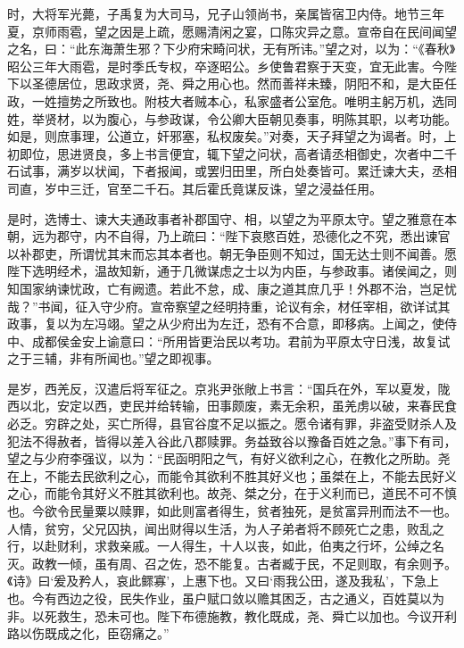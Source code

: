 \documentclass[12pt,UTF8]{ctexbook}
\begin{document}
时，大将军光薨，子禹复为大司马，兄子山领尚书，亲属皆宿卫内侍。地节三年夏，京师雨雹，望之因是上疏，愿赐清闲之宴，口陈灾异之意。宣帝自在民间闻望之名，曰：“此东海萧生邪？下少府宋畸问状，无有所讳。”望之对，以为：“《春秋》昭公三年大雨雹，是时季氏专权，卒逐昭公。乡使鲁君察于天变，宜无此害。今陛下以圣德居位，思政求贤，尧、舜之用心也。然而善祥未臻，阴阳不和，是大臣任政，一姓擅势之所致也。附枝大者贼本心，私家盛者公室危。唯明主躬万机，选同姓，举贤材，以为腹心，与参政谋，令公卿大臣朝见奏事，明陈其职，以考功能。如是，则庶事理，公道立，奸邪塞，私权废矣。”对奏，天子拜望之为谒者。时，上初即位，思进贤良，多上书言便宜，辄下望之问状，高者请丞相御史，次者中二千石试事，满岁以状闻，下者报闻，或罢归田里，所白处奏皆可。累迁谏大夫，丞相司直，岁中三迁，官至二千石。其后霍氏竟谋反诛，望之浸益任用。



是时，选博士、谏大夫通政事者补郡国守、相，以望之为平原太守。望之雅意在本朝，远为郡守，内不自得，乃上疏曰：“陛下哀愍百姓，恐德化之不究，悉出谏官以补郡吏，所谓忧其末而忘其本者也。朝无争臣则不知过，国无达士则不闻善。愿陛下选明经术，温故知新，通于几微谋虑之士以为内臣，与参政事。诸侯闻之，则知国家纳谏忧政，亡有阙遗。若此不怠，成、康之道其庶几乎！外郡不治，岂足忧哉？”书闻，征入守少府。宣帝察望之经明持重，论议有余，材任宰相，欲详试其政事，复以为左冯翊。望之从少府出为左迁，恐有不合意，即移病。上闻之，使侍中、成都侯金安上谕意曰：“所用皆更治民以考功。君前为平原太守日浅，故复试之于三辅，非有所闻也。”望之即视事。



是岁，西羌反，汉遣后将军征之。京兆尹张敞上书言：“国兵在外，军以夏发，陇西以北，安定以西，吏民并给转输，田事颇废，素无余积，虽羌虏以破，来春民食必乏。穷辟之处，买亡所得，县官谷度不足以振之。愿令诸有罪，非盗受财杀人及犯法不得赦者，皆得以差入谷此八郡赎罪。务益致谷以豫备百姓之急。”事下有司，望之与少府李强议，以为：“民函明阳之气，有好义欲利之心，在教化之所助。尧在上，不能去民欲利之心，而能令其欲利不胜其好义也；虽桀在上，不能去民好义之心，而能令其好义不胜其欲利也。故尧、桀之分，在于义利而已，道民不可不慎也。今欲令民量粟以赎罪，如此则富者得生，贫者独死，是贫富异刑而法不一也。人情，贫穷，父兄囚执，闻出财得以生活，为人子弟者将不顾死亡之患，败乱之行，以赴财利，求救亲戚。一人得生，十人以丧，如此，伯夷之行坏，公绰之名灭。政教一倾，虽有周、召之佐，恐不能复。古者臧于民，不足则取，有余则予。《诗》曰‘爰及矜人，哀此鳏寡’，上惠下也。又曰‘雨我公田，遂及我私’，下急上也。今有西边之役，民失作业，虽户赋口敛以赡其困乏，古之通义，百姓莫以为非。以死救生，恐未可也。陛下布德施教，教化既成，尧、舜亡以加也。今议开利路以伤既成之化，臣窃痛之。”
\end{document}
